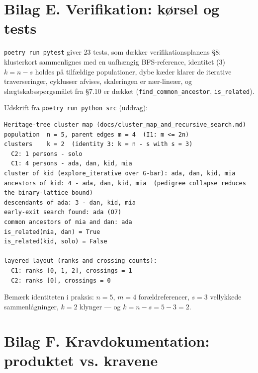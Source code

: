 \documentclass[12pt, a4paper]{article}
\begin{document}
\bigskip
\noindent{}

\bigskip
\noindent{}

\section*{Bilag E. Verifikation: kørsel og tests}

\texttt{poetry run pytest} giver 23 tests, som dækker verifikationsplanens \S 8:
klusterkort sammenlignes med en uafhængig BFS-reference, identitet (3)
$k = n - s$ holdes på tilfældige populationer, dybe kæder klarer de iterative
traverseringer, cyklusser afvises, skaleringen er nær-lineær, og
slægtskabsspørgsmålet fra \S 7.10 er dækket (\texttt{find\_common\_ancestor},
\texttt{is\_related}).

Udskrift fra \texttt{poetry run python src} (uddrag):

\begin{lstlisting}[basicstyle=\ttfamily\footnotesize]
Heritage-tree cluster map (docs/cluster_map_and_recursive_search.md)
population  n = 5, parent edges m = 4  (I1: m <= 2n)
clusters    k = 2  (identity 3: k = n - s with s = 3)
  C2: 1 persons - solo
  C1: 4 persons - ada, dan, kid, mia
cluster of kid (explore_iterative over G-bar): ada, dan, kid, mia
ancestors of kid: 4 - ada, dan, kid, mia  (pedigree collapse reduces
the binary-lattice bound)
descendants of ada: 3 - dan, kid, mia
early-exit search found: ada (O7)
common ancestors of mia and dan: ada
is_related(mia, dan) = True
is_related(kid, solo) = False

layered layout (ranks and crossing counts):
  C1: ranks [0, 1, 2], crossings = 1
  C2: ranks [0], crossings = 0
\end{lstlisting}

Bem{\ae}rk identiteten i praksis: $n = 5$, $m = 4$ forældreferencer,
$s = 3$ vellykkede sammenl{\aa}gninger, $k = 2$ klynger --- og
$k = n - s = 5 - 3 = 2$.

\section*{Bilag F. Kravdokumentation: produktet vs. kravene}
\end{document}
